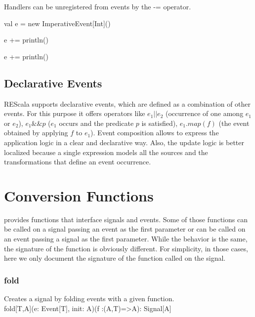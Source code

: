 \documentclass[10pt,a4paper]{article}
\newcommand{\code}[1]{{\fontfamily{cmtt}\small\selectfont#1}}
\newcommand{\REScala}{{\small \sc{REScala}}\xspace}
\begin{document}
Handlers can be unregistered from events by the \code{-=} operator.

\begin{codenv}
val e = new ImperativeEvent[Int]()

e += { println() }


e += { println() }
\end{codenv}




\subsection{Declarative Events}


REScala supports declarative events, which are defined as a
combination of other events. For this purpose it offers operators like
$e_1||e_2$ (occurrence of one among $e_1$ or $e_2$), $e_1\&\&p$ ($e_1$
occurs and the predicate $p$ is satisfied), $e_1.map(f)$ (the event
obtained by applying $f$ to $e_1$).  Event composition allows to
express the application logic in a clear and declarative way. Also,
the update logic is better localized because a single expression
models all the sources and the transformations that define an event
occurrence.











\section{Conversion Functions}

\REScala provides functions that interface signals and events. Some of
those functions can be called on a signal passing an event as the
first parameter or can be called on an event passing a signal as the
first parameter. While the behavior is the same, the signature of the
function is obviously different. For simplicity, in those cases, here
we only document the signature of the function called on the signal.


\subsubsection*{fold}

Creates a signal by folding events with a given function.\\
\code{fold[T,A](e: Event[T], init: A)(f :(A,T)=>A): Signal[A]}
\end{document}
